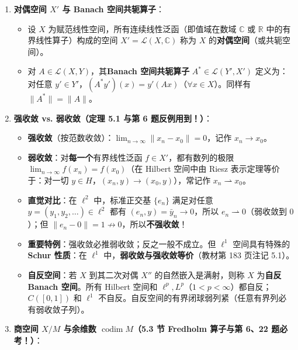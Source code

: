 \documentclass[11pt,a4paper]{article}
\providecommand{\tightlist}{\setlength{\itemsep}{1.8pt}\setlength{\parskip}{0pt}}
\begin{document}
\begin{enumerate}
\def\labelenumi{\arabic{enumi}.}
\tightlist
\item
  \textbf{对偶空间 \(X'\) 与 Banach 空间共轭算子}：

  \begin{itemize}
  \tightlist
  \item
    设 \(X\) 为赋范线性空间，所有连续线性泛函（即值域在数域 \(\mathbb{C}\) 或 \(\mathbb{R}\) 中的有界线性算子）构成的空间 \(X' = \mathcal{L}(X, \mathbb{C})\) 称为 \(X\) 的\textbf{对偶空间}（或共轭空间）。
  \item
    对 \(A \in \mathcal{L}(X, Y)\)，其\textbf{Banach 空间共轭算子} \(A^* \in \mathcal{L}(Y', X')\) 定义为：对任意 \(y' \in Y'\)，\((A^* y')(x) = y'(Ax)\)（\(\forall x \in X\)）。同样有 \(\|A^*\| = \|A\|\)。
  \end{itemize}
\item
  \textbf{强收敛 vs. 弱收敛（定理 5.1 与第 6 题反例用到！）}：

  \begin{itemize}
  \tightlist
  \item
    \textbf{强收敛}（按范数收敛）：\(\lim_{n\to\infty} \|x_n - x_0\| = 0\)，记作 \(x_n \to x_0\)。
  \item
    \textbf{弱收敛}：对\textbf{每一个}有界线性泛函 \(f \in X'\)，都有数列的极限 \(\lim_{n\to\infty} f(x_n) = f(x_0)\)（在 Hilbert 空间中由 Riesz 表示定理等价于：对一切 \(y \in H\)，\((x_n, y) \to (x_0, y)\)），常记作 \(x_n \rightharpoonup x_0\)。
  \item
    \textbf{直觉对比}：在 \(\ell^2\) 中，标准正交基 \(\{e_n\}\) 满足对任意 \(y = (y_1, y_2, \dots) \in \ell^2\) 都有 \((e_n, y) = \bar{y}_n \to 0\)，所以 \(e_n \rightharpoonup 0\)（弱收敛到 \(0\)）；但 \(\|e_n - 0\| = 1 \not\to 0\)，所以\textbf{不强收敛}！
  \item
    \textbf{重要特例}：强收敛必推弱收敛；反之一般不成立。但 \(\ell^1\) 空间具有特殊的 \textbf{Schur 性质}：在 \(\ell^1\) 中，\textbf{弱收敛与强收敛等价}（教材第 183 页注记 5.1）。
  \item
    \textbf{自反空间}：若 \(X\) 到其二次对偶 \(X''\) 的自然嵌入是满射，则称 \(X\) 为\textbf{自反 Banach 空间}。所有 Hilbert 空间和 \(\ell^p, L^p\)（\(1 < p < \infty\)）都自反；\(C([0,1])\) 和 \(\ell^1\) 不自反。自反空间的有界闭球弱列紧（任意有界列必有弱收敛子列）。
  \end{itemize}
\item
  \textbf{商空间 \(X / M\) 与余维数 \(\operatorname{codim} M\)（5.3 节 Fredholm 算子与第 6、22 题必考！）}：


\end{enumerate}
\end{document}

